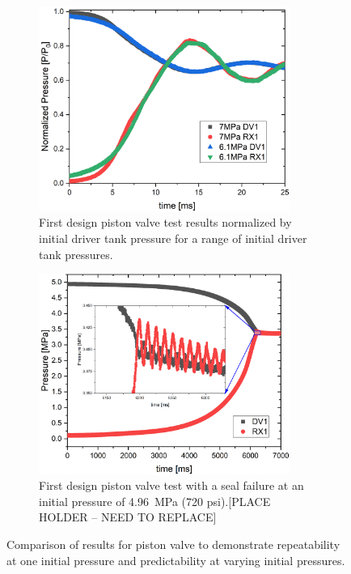 \begin{figure}[bt]
    \vspace{16pt}
    \centering
    \begin{subfigure}[t]{0.45\textwidth}
        \centering
        \includegraphics[width=0.9\textwidth]{results/plots/Normalized_RX1_MtM_annular.png}
        \caption{First design piston valve test results normalized by initial driver tank pressure for a range of initial driver tank pressures.}
        \label{fig:norm}
    \end{subfigure}
    \hfill
    \begin{subfigure}[t]{0.45\textwidth}
        \centering
        \includegraphics[width=0.9\textwidth]{results/plots/718psi_MTM_annu_failed_test.png}
        \caption{First design piston valve test with a seal failure at an initial pressure of \SI{4.96}{\mega\pascal} (720 psi).[PLACE HOLDER -- NEED TO REPLACE]}
        \label{fig:piston 2 test}
    \end{subfigure}
    \caption{Comparison of results for piston valve to demonstrate repeatability at one initial pressure and predictability at varying initial pressures.}
    \label{fig:piston repeatability}
    \vspace{16pt}
\end{figure}


